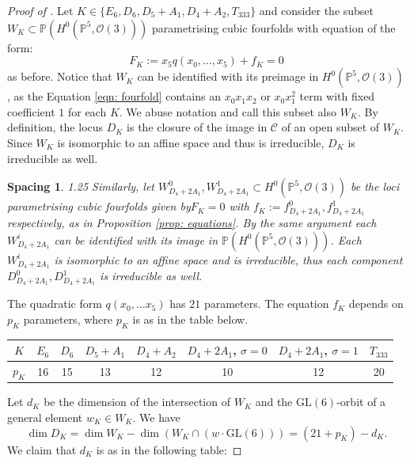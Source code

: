 \documentclass[10pt,a4paper]{amsart}
\newtheorem{spacing}{Spacing}
\newcommand{\GL}{\mathrm{GL}}
\newcommand{\bP}{\mathbb{P}}
\newcommand{\calC}{\mathcal{C}}
\newcommand{\calO}{\mathcal{O}}
\begin{document}
\begin{proof}[Proof of ]
    Let  $K\in\{E_6, D_6, D_5+A_1, D_4+A_2, T_{333}\}$ and consider the subset $W_K\subset \bP(H^0(\bP^5, \calO(3)))$ parametrising cubic fourfolds with equation of the form:
    \begin{equation}
        F_K:=x_5q(x_0,\ldots,x_5)+f_K=0
    \end{equation}
    as before.
    Notice that $W_K$ can be identified with its preimage in $H^0(\bP^5, \calO(3))$, as the Equation \ref{eqn: fourfold} contains an $x_0x_1x_2$ or $x_0x_1^2$ term with fixed coefficient $1$ for each $K$. 
    We abuse notation and call this subset also $W_K$. 
    By definition, the locus $D_{K}$ is the closure of the image in $\calC$ of an open subset of $W_K$. 
    Since $W_K$ is isomorphic to an affine space and thus is irreducible, $D_{K}$ is irreducible as well.

    \begin{spacing}{1.25}
    Similarly, let $W_{D_4+2A_1}^0,W_{D_4+2A_1}^1\subset H^0(\bP^5, \calO(3))$ be the loci parametrising cubic fourfolds given by$F_K=0$ with $f_K:=f^0_{D_4+2A_1},f^1_{D_4+2A_1}$ respectively, as in Proposition \ref{prop: equations}. 
    By the same argument each $W_{D_4+2A_1}^i$ can be identified with its image in $\bP(H^0(\bP^5,\calO(3)))$. 
    Each $W_{D_4+2A_1}^i$ is isomorphic to an affine space and is irreducible, thus each component $D_{D_4+2A_1}^0, D_{D_4+2A_1}^1$ is irreducible as well.
  \end{spacing}
  
    The quadratic form $q(x_0,\dots x_5)$ has $21$ parameters. The equation $f_K$ depends on $p_K$ parameters, where $p_K$ is as in the table below.

\begin{table}[h!]
\centering
\begin{tabular}{c|c|c|c|c|c|c|c}

$K$ & $E_6$ & $D_6$ & $D_5+A_1$& $D_4+A_2$ & $D_4+2A_1$, $\sigma=0$ & $D_4+2A_1$, $\sigma=1$ & $T_{333}$ \\ \hline
$p_K$   & 16   & 15   & 13   & 12  & 10  & 12 & 20 \\ 
\end{tabular}

\label{tab: parameter counts}
\end{table}
        
    Let $d_K$ be the dimension of the intersection of $W_K$ and the $\GL(6)$-orbit of a general element $w_K\in W_K$. 
    We have 
    \begin{equation}\label{eqn: dimension}
        \dim D_K=\dim W_K-\dim(W_K\cap (w\cdot\GL(6)))=(21+p_K)-d_K.
    \end{equation}
    We claim that $d_K$ is as in the following table:


\end{proof}
\end{document}
